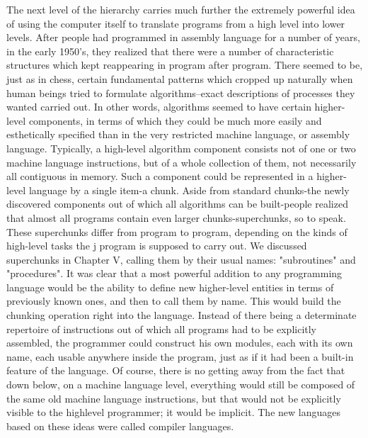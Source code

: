        The next level of the hierarchy carries much further the extremely powerful idea
       of using the computer itself to translate programs from a high level into lower
       levels. After people had programmed in assembly language for a number of years,
       in the early 1950's, they realized that there were a number of characteristic
       structures which kept reappearing in program after program. There seemed to be,
       just as in chess, certain fundamental patterns which cropped up naturally when
       human beings tried to formulate algorithms--exact descriptions of processes they
       wanted carried out. In other words, algorithms seemed to have certain higher-
       level components, in terms of which they could be much more easily and
       esthetically specified than in the very restricted machine language, or assembly
       language. Typically, a high-level algorithm component consists not of one or two
       machine language instructions, but of a whole collection of them, not necessarily
       all contiguous in memory. Such a component could be represented in a higher-
       level language by a single item-a chunk.
               Aside from standard chunks-the newly discovered components out of
       which all algorithms can be built-people realized that almost all programs contain
       even larger chunks-superchunks, so to speak. These superchunks differ from
       program to program, depending on the kinds of high-level tasks the j program is
       supposed to carry out. We discussed superchunks in Chapter V, calling them by
       their usual names: "subroutines" and "procedures". It was clear that a most
       powerful addition to any programming language would be the ability to define
       new higher-level entities in terms of previously known ones, and then to call them
       by name. This would build the chunking operation right into the language. Instead
       of there being a determinate repertoire of instructions out of which all programs
       had to be explicitly assembled, the programmer could construct his own modules,
       each with its own name, each usable anywhere inside the program, just as if it had
       been a built-in feature of the language. Of course, there is no getting away from
       the fact that down below, on a machine language level, everything would still be
       composed of the same old machine language instructions, but that would not be
       explicitly visible to the highlevel programmer; it would be implicit.
               The new languages based on these ideas were called compiler languages.
